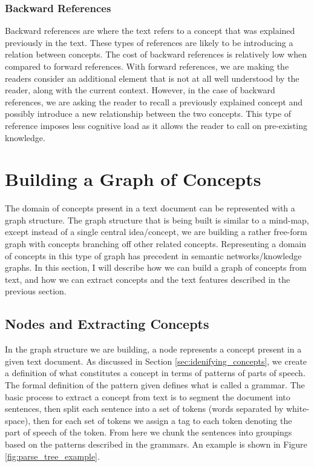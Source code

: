 \documentclass[12pt]{article}
\theoremstyle{grammarstyle}
\begin{document}
\subsubsection{Backward References}
Backward references are where the text refers to a concept that was explained previously in the text. These types of references are likely to be introducing a relation between concepts. The cost of backward references is relatively low when compared to forward references. With forward references, we are making the readers consider an additional element that is not at all well understood by the reader, along with the current context. However, in the case of backward references, we are asking the reader to recall a previously explained concept and possibly introduce a new relationship between the two concepts. This type of reference imposes less cognitive load as it allows the reader to call on pre-existing knowledge.

\section{Building a Graph of Concepts} \label{sec:building_a_graph_of_concepts}
The domain of concepts present in a text document can be represented with a graph structure. The graph structure that is being built is similar to a mind-map, except instead of a single central idea/concept, we are building a rather free-form graph with concepts branching off other related concepts. Representing a domain of concepts in this type of graph has precedent in semantic networks/knowledge graphs.
In this section, I will describe how we can build a graph of concepts from text, and how we can extract concepts and the text features described in the previous section.

\subsection{Nodes and Extracting Concepts}
In the graph structure we are building, a node represents a concept present in a given text document. As discussed in Section \ref{sec:idenifying_concepts}, we create a definition of what constitutes a concept in terms of patterns of parts of speech. The formal definition of the pattern given defines what is called a grammar. The basic process to extract a concept from text is to segment the document into sentences, then split each sentence into a set of tokens (words separated by white-space), then for each set of tokens we assign a tag to each token denoting the part of speech of the token. From here we chunk the sentences into groupings based on the patterns described in the grammars. An example is shown in Figure \ref{fig:parse_tree_example}.
\end{document}
